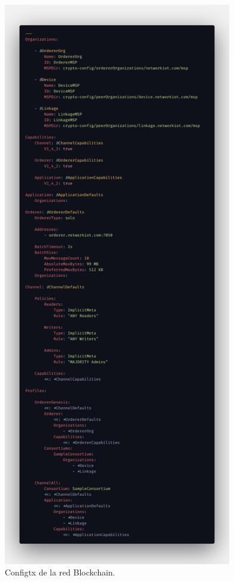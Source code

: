 \begin{figure}[ht!]
  \centering
  \includegraphics[width=10cm]{imagenes/desarrollo/configtx}
  \caption{Configtx de la red Blockchain.}
  \label{fig:configtx-blockchain}
\end{figure}

